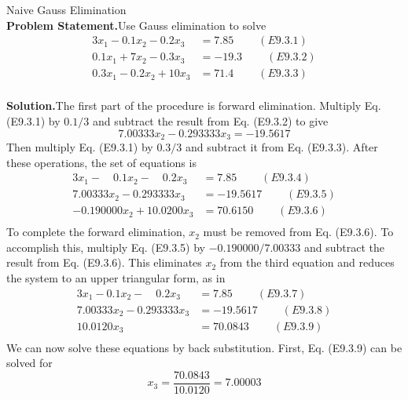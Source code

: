 \documentclass[../main.tex]{subfiles}
\begin{document}
\begin{example} Naive Gauss Elimination\\

    \noindent\textbf{Problem Statement.}\quad Use Gauss elimination to solve\\

    $$
    \begin{aligned}
    3 x_{1}-0.1 x_{2}-0.2 x_{3} &=7.85  \ \ \ \ \ \ \ \ \ \ (E9.3.1)\\
    0.1 x_{1}+7 x_{2}-0.3 x_{3} &=-19.3  \ \ \ \ \ \ \ \ \ \ (E9.3.2)\\
    0.3 x_{1}-0.2 x_{2}+10 x_{3} &=71.4  \ \ \ \ \ \ \ \ \ \ (E9.3.3)\\
    \end{aligned}
    $$

    \noindent\textbf{Solution.}\quad The first part of the procedure is forward elimination. Multiply Eq. (E9.3.1) by $0.1 / 3$ and subtract the result from Eq. (E9.3.2) to give\\
    $$
    7.00333 x_{2}-0.293333 x_{3}=-19.5617
    $$
    Then multiply Eq. (E9.3.1) by $0.3 / 3$ and subtract it from Eq. (E9.3.3). After these operations, the set of equations is
    $$
    \begin{aligned}
    3 x_{1}-\quad 0.1 x_{2}-\quad 0.2 x_{3} &=7.85  \ \ \ \ \ \ \ \ \ \ (E9.3.4)\\
    7.00333 x_{2}-0.293333 x_{3} &=-19.5617  \ \ \ \ \ \ \ \ \ \ (E9.3.5)\\
    -0.190000 x_{2}+10.0200 x_{3} &=70.6150  \ \ \ \ \ \ \ \ \ \ (E9.3.6)\\
    \end{aligned}
    $$
    To complete the forward elimination, $x_{2}$ must be removed from Eq. (E9.3.6). To accomplish this, multiply Eq. (E9.3.5) by $-0.190000 / 7.00333$ and subtract the result from Eq. (E9.3.6). This eliminates $x_{2}$ from the third equation and reduces the system to an upper triangular form, as in
    $$
    \begin{aligned}
    3 x_{1}-0.1 x_{2}-\quad 0.2 x_{3} &=7.85   \ \ \ \ \ \ \ \ \ \ (E9.3.7)\\
    7.00333 x_{2}-0.293333 x_{3} &=-19.5617   \ \ \ \ \ \ \ \ \ \ (E9.3.8)\\
    10.0120 x_{3} &=70.0843   \ \ \ \ \ \ \ \ \ \ (E9.3.9)\\
    \end{aligned}
    $$
    We can now solve these equations by back substitution. First, Eq. (E9.3.9) can be solved for
    $$
    x_{3}=\frac{70.0843}{10.0120}=7.00003
$$
\end{example}
\end{document}
